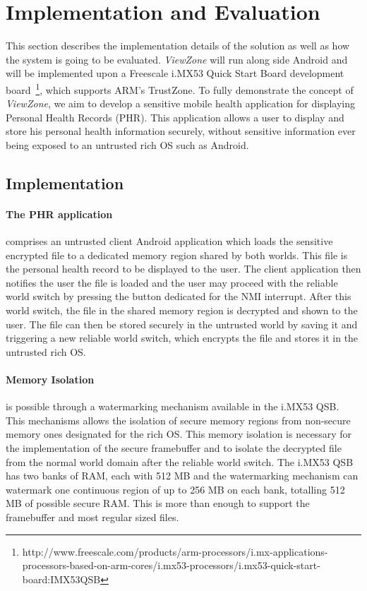 
% 
% 
\section{Implementation and Evaluation}
\label{sec:evaluation}

This section describes the implementation details of the solution as well as how the system is going to be evaluated. \emph{ViewZone} will run along side Android and will be implemented upon a Freescale i.MX53 Quick Start Board development board~\footnote{http://www.freescale.com/products/arm-processors/i.mx-applications-processors-based-on-arm-cores/i.mx53-processors/i.mx53-quick-start-board:IMX53QSB}, which supports ARM's TrustZone. To fully demonstrate the concept of \emph{ViewZone}, we aim to develop a sensitive mobile health application for displaying Personal Health Records (PHR). This application allows a user to display and store his personal health information securely, without sensitive information ever being exposed to an untrusted rich OS such as Android.

\subsection{Implementation}

\paragraph{The \ac{PHR} application} comprises an untrusted client Android application which loads the sensitive encrypted file to a dedicated memory region shared by both worlds. This file is the personal health record to be displayed to the user. The client application then notifies the user the file is loaded and the user may proceed with the reliable world switch by pressing the button dedicated for the \ac{NMI} interrupt. After this world switch, the file in the shared memory region is decrypted and shown to the user. The file can then be stored securely in the untrusted world by saving it and triggering a new reliable world switch, which encrypts the file and stores it in the untrusted rich OS.


\paragraph{Memory Isolation} is possible through a watermarking mechanism available in the i.MX53 QSB. This mechanisms allows  the isolation of secure memory regions from non-secure memory ones designated for the rich OS. This memory isolation is necessary for the implementation of the secure framebuffer and to isolate the decrypted file from the normal world domain after the reliable world switch. The i.MX53 QSB has two banks of RAM, each with 512 MB and the watermarking mechanism can watermark one continuous region of up to 256 MB on each bank, totalling 512 MB of possible secure RAM. This is more than enough to support the framebuffer and most regular sized files.

